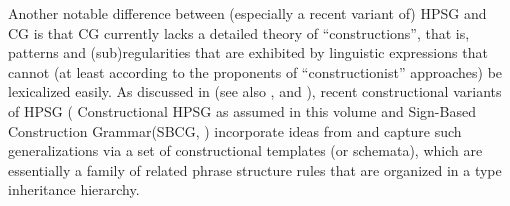 \documentclass[output=paper
                ,modfonts
 	        ,biblatex
                ,babelshorthands
                ,newtxmath
                ,draftmode
                ,colorlinks, citecolor=brown
]{langscibook}
\begin{document}


Another notable difference between (especially a recent variant of)
HPSG and CG is that CG currently lacks a detailed theory of
``constructions'', 
that is, patterns and (sub)regularities that are
exhibited by linguistic expressions that cannot (at least according to
the proponents of ``constructionist'' approaches) be lexicalized easily.
As discussed in  (see also
\citealt{Sag97a}, \citealt{Fillmore99a} and \citealt{GSag2000a-u}),  recent constructional variants
of HPSG (\eg {} Constructional HPSG as assumed in this volume and Sign-Based Construction
Grammar\indexsbcg (SBCG, \citealp{SBK2012a}) incorporate ideas from  
\citep{FKoC88a} and capture such
generalizations via a set of constructional templates (or schemata),
which are essentially a family of related phrase structure rules that
are organized in a type inheritance hierarchy.
\end{document}
